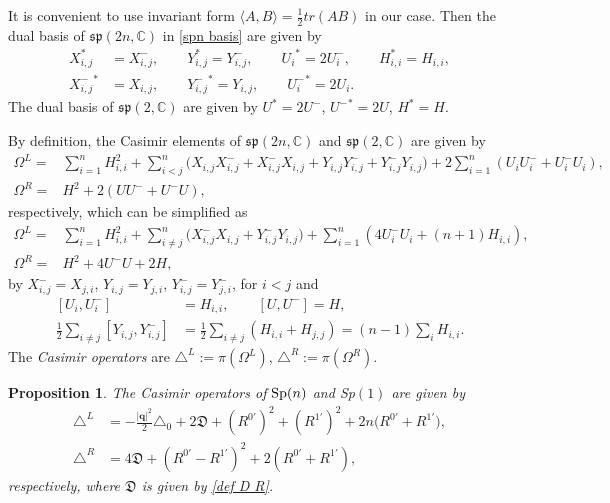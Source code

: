 \documentclass[a4paper,11pt]{amsart}
\numberwithin{equation}{section}
\newtheorem{prop}{Proposition}[section]
\begin{document}
It is convenient to use invariant form $\langle A,B\rangle=\frac12tr(AB)$ in our case.
Then the dual basis of $\mathfrak{sp}(2n,\mathbb{C})$ in \eqref{spn basis} are given by
\begin{equation*}\begin{aligned}
X_{i,j}^*&=X_{i,j}^-,\qquad Y_{i,j}^*=Y_{i,j}^{-},\qquad {U_i}^*=2U_i^-,\qquad H_{i,i}^*=H_{i,i},\\
{X_{i,j}^{-}}^*&=X_{i,j},\qquad{Y_{i,j}^{-}}^*=Y_{i,j},\quad\quad{U_i^-}^*=2U_i.
\end{aligned}\end{equation*}
The dual basis of $\mathfrak{sp}(2,\mathbb{C})$ are given by $U^*=2U^{-}$, ${U^{-}}^*=2U$, $H^*=H$.

By definition, the Casimir elements of $\mathfrak{sp}(2n,\mathbb{C})$ and $\mathfrak{sp}(2,\mathbb{C})$ are given by
\begin{equation}\begin{aligned}\label{casimir element}
\Omega^L=&
\sum_{i=1}^n H_{i,i}^2+\sum_{i<j}^n\bigl(X_{i,j}X_{i,j}^-+X_{i,j}^-X_{i,j}
+Y_{i,j}Y_{i,j}^{-} +Y_{i,j}^{-}Y_{i,j} \bigr)+ 2\sum_{i=1}^n (U_iU_i^{-}+U_i^{-}U_i),\\
\Omega^R=&  H^2 + 2(UU^{-} + U^{-}U),
\end{aligned}\end{equation}
respectively, which can be simplified as
\begin{equation}\begin{aligned}\label{casimir element 1}
\Omega^L=&
\sum_{i=1}^n H_{i,i}^2+\sum_{i\neq j}^n\bigl(X_{i,j}^-X_{i,j}
+ Y_{i,j}^{-}Y_{i,j} \bigr)+ \sum_{i=1}^n \left(4U_i^{-}U_i+(n+1)H_{i,i}\right),\\
\Omega^R=&  H^2  + 4U^{-}U+2H,
\end{aligned}\end{equation}
by $X_{i,j}^-=X_{j,i}$, $Y_{i,j}=Y_{j,i}$, $Y_{i,j}^-=Y_{j,i}^-$, for $i<j$ and
\begin{equation}\begin{aligned}
\left[U_i,U_i^{-}\right]&=H_{i,i},\qquad \left[U,U^{-}\right]=H,\\
\frac{1}{2}\sum_{i\neq j}[Y_{i,j},Y_{i,j}^-]&=\frac{1}{2}\sum_{i\neq j}(H_{i,i}+H_{j,j})=(n-1)\sum_{i}H_{i,i}.
\end{aligned}\end{equation}
The {\it Casimir operators} are $\triangle^L:=\pi(\Omega^L)$, $\triangle^R:=\pi(\Omega^R)$.


\begin{prop}\label{Ap 2}
The Casimir operators of ${\rm Sp}(n)$ and Sp$(1)$ are given by
\begin{equation}\begin{aligned}\label{omegaLex}
\triangle^L&=-\frac{|\mathbf{q}|^2}{2}\triangle_0+2\mathfrak{D}+(R^{0'})^2+(R^{1'})^2+2n\bigl(R^{0'}+R^{1'}\bigr),\\
\triangle^R&=4 \mathfrak{D}+(R^{0'}-R^{1'})^2+2(R^{0'}+R^{1'}),
\end{aligned}\end{equation}
respectively, where $\mathfrak{D}$ is given by \eqref{def D R}.
\end{prop}
\end{document}
